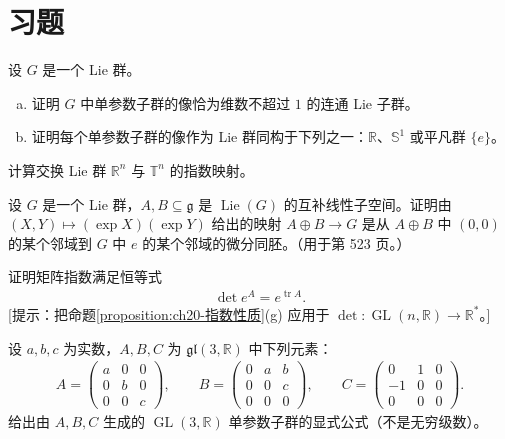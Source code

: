 \documentclass[../../main.tex]{subfiles}
\begin{document}
\section{习题}\label{section:ch20-problems}

\begin{exercise}\label{exercise:ch20-01}
设 $G$ 是一个 Lie 群。
\begin{enumerate}[(a)]
\item 证明 $G$ 中单参数子群的像恰为维数不超过 $1$ 的连通 Lie 子群。
\item 证明每个单参数子群的像作为 Lie 群同构于下列之一：$\mathbb{R}$、$\mathbb{S}^1$ 或平凡群 $\{e\}$。
\end{enumerate}
\end{exercise}

\begin{exercise}\label{exercise:ch20-02}
计算交换 Lie 群 $\mathbb{R}^n$ 与 $\mathbb{T}^n$ 的指数映射。
\end{exercise}

\begin{exercise}\label{exercise:ch20-03}
设 $G$ 是一个 Lie 群，$A,B\subseteq\mathfrak g$ 是 $\operatorname{Lie}(G)$ 的互补线性子空间。证明由 $(X,Y)\mapsto(\exp X)(\exp Y)$ 给出的映射 $A\oplus B\to G$ 是从 $A\oplus B$ 中 $(0,0)$ 的某个邻域到 $G$ 中 $e$ 的某个邻域的微分同胚。（用于第 523 页。）
\end{exercise}

\begin{exercise}\label{exercise:ch20-04}
证明矩阵指数满足恒等式
\begin{align*}
\det e^A=e^{\operatorname{tr}A}.
\end{align*}
[提示：把命题\cref{proposition:ch20-指数性质}(g) 应用于 $\det\colon\operatorname{GL}(n,\mathbb{R})\to\mathbb{R}^*$。]
\end{exercise}

\begin{exercise}\label{exercise:ch20-05}
设 $a,b,c$ 为实数，$A,B,C$ 为 $\mathfrak{gl}(3,\mathbb{R})$ 中下列元素：
\begin{align*}
A=\begin{pmatrix}a&0&0\\0&b&0\\0&0&c\end{pmatrix},\qquad
B=\begin{pmatrix}0&a&b\\0&0&c\\0&0&0\end{pmatrix},\qquad
C=\begin{pmatrix}0&1&0\\-1&0&0\\0&0&0\end{pmatrix}.
\end{align*}
给出由 $A,B,C$ 生成的 $\operatorname{GL}(3,\mathbb{R})$ 单参数子群的显式公式（不是无穷级数）。
\end{exercise}
\end{document}
